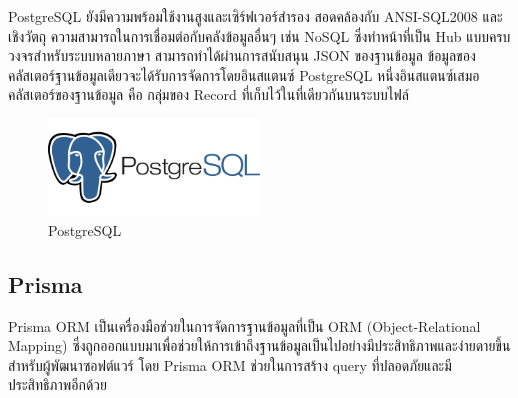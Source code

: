 PostgreSQL ยังมีความพร้อมใช้งานสูงและเซิร์ฟเวอร์สำรอง สอดคล้องกับ ANSI-SQL2008 และเชิงวัตถุ ความสามารถในการเชื่อมต่อกับคลังข้อมูลอื่นๆ เช่น NoSQL ซึ่งทำหน้าที่เป็น Hub แบบครบวงจรสำหรับระบบหลายภาษา สามารถทำได้ผ่านการสนับสนุน JSON ของฐานข้อมูล ข้อมูลของคลัสเตอร์ฐานข้อมูลเดียวจะได้รับการจัดการโดยอินสแตนซ์ PostgreSQL หนึ่งอินสแตนซ์เสมอ คลัสเตอร์ของฐานข้อมูล คือ กลุ่มของ Record ที่เก็บไว้ในที่เดียวกันบนระบบไฟล์
\begin{figure}
    \centering
    \includegraphics[width=0.5\textwidth]{img/postgresql.png}
    \caption{PostgreSQL}
    \label{fig:postgresql}
\end{figure}

\subsection{Prisma}
Prisma ORM \cite{web:prisma} เป็นเครื่องมือช่วยในการจัดการฐานข้อมูลที่เป็น ORM (Object-Relational Mapping) ซึ่งถูกออกแบบมาเพื่อช่วยให้การเข้าถึงฐานข้อมูลเป็นไปอย่างมีประสิทธิภาพและง่ายดายขึ้นสำหรับผู้พัฒนาซอฟต์แวร์ โดย Prisma ORM ช่วยในการสร้าง query ที่ปลอดภัยและมีประสิทธิภาพอีกด้วย


